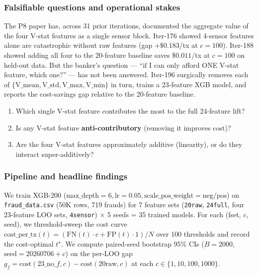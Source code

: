 
\subsubsection{Falsifiable questions and operational stakes}\label{sec:p8-iter196-questions}
The P8 paper has, across 31 prior iterations, documented the aggregate
value of the four V-stat features as a single sensor block. Iter-176 showed
4-sensor features alone are catastrophic without raw features
(gap $+\$0.183$/tx at $c{=}100$). Iter-188 showed adding all four to the
20-feature baseline saves $\$0.011$/tx at $c{=}100$ on held-out data.
But the banker's question --- ``if I can only afford ONE V-stat feature,
which one?'' --- has not been answered. Iter-196 surgically removes each
of $\{\mathrm{V\_mean}, \mathrm{V\_std}, \mathrm{V\_max}, \mathrm{V\_min}\}$
in turn, trains a 23-feature XGB model, and reports the cost-savings gap
relative to the 20-feature baseline.

\begin{enumerate}
\item Which single V-stat feature contributes the most to the full
  24-feature lift?
\item Is any V-stat feature \textbf{anti-contributory} (removing it
  improves cost)?
\item Are the four V-stat features approximately additive (linearity),
  or do they interact super-additively?
\end{enumerate}

\subsubsection{Pipeline and headline findings}\label{sec:p8-iter196-pipeline}
We train XGB-200 ($\mathrm{max\_depth}{=}6, \mathrm{lr}{=}0.05,
\mathrm{scale\_pos\_weight}{=}\mathrm{neg}/\mathrm{pos}$) on
\texttt{fraud\_data.csv} (50K rows, 719 frauds) for 7 feature sets
(\texttt{20raw}, \texttt{24full}, four 23-feature LOO sets, \texttt{4sensor})
$\times$ 5 seeds = 35 trained models. For each
(fset, $c$, seed), we threshold-sweep the cost curve
$\mathrm{cost\_per\_tx}(t) = (\mathrm{FN}(t) \cdot c + \mathrm{FP}(t) \cdot 1)/N$
over 100 thresholds and record the cost-optimal $t^{\star}$. We compute
paired-seed bootstrap 95\% CIs ($B{=}2000$, $\mathrm{seed}{=}20260706{+}c$)
on the per-LOO gap $g_f = \mathrm{cost}(\mathrm{23\_no\_}f, c) -
\mathrm{cost}(\mathrm{20raw}, c)$ at each $c \in \{1, 10, 100, 1000\}$.


